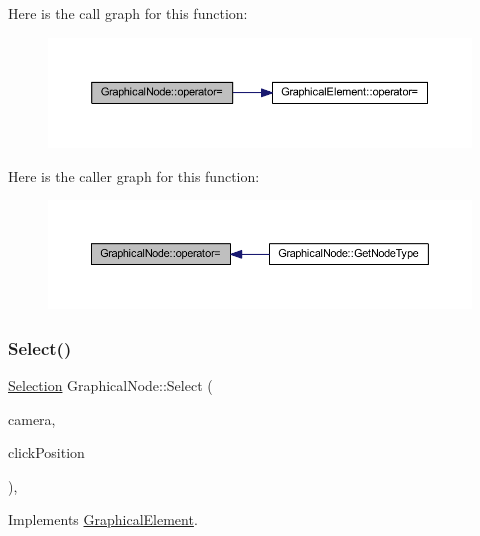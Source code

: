 Here is the call graph for this function\+:
\nopagebreak
\begin{figure}[H]
\begin{center}
\leavevmode
\includegraphics[width=350pt]{class_graphical_node_a9c5dc1b7f344e2785531318167c2826b_cgraph}
\end{center}
\end{figure}
Here is the caller graph for this function\+:
\nopagebreak
\begin{figure}[H]
\begin{center}
\leavevmode
\includegraphics[width=350pt]{class_graphical_node_a9c5dc1b7f344e2785531318167c2826b_icgraph}
\end{center}
\end{figure}
\mbox{\label{class_graphical_node_ac73e20f3d4c5cca556e0140ef558f6a4}} 
\subsubsection{\texorpdfstring{Select()}{Select()}}
{\footnotesize\ttfamily \hyperlink{struct_selection}{Selection} Graphical\+Node\+::\+Select (\begin{DoxyParamCaption}\item[{const wx\+Affine\+Matrix2D \&}]{camera,  }\item[{wx\+Point2\+D\+Double}]{click\+Position }\end{DoxyParamCaption})\hspace{0.3cm}{\ttfamily [override]}, {\ttfamily [virtual]}}



Implements \hyperlink{class_graphical_element_a2627b34e57829f942aa00720d9cc8b46}{Graphical\+Element}.



